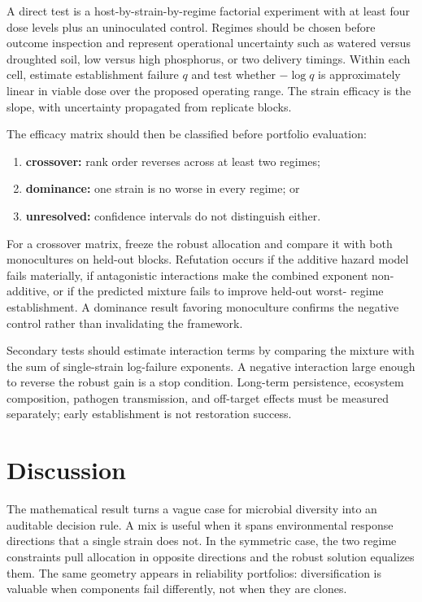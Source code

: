 \documentclass[10pt,twocolumn]{article}
\begin{document}
A direct test is a host-by-strain-by-regime factorial experiment with at least
four dose levels plus an uninoculated control. Regimes should be chosen before
outcome inspection and represent operational uncertainty such as watered versus
droughted soil, low versus high phosphorus, or two delivery timings. Within
each cell, estimate establishment failure $q$ and test whether
$-\log q$ is approximately linear in viable dose over the proposed operating
range. The strain efficacy is the slope, with uncertainty propagated from
replicate blocks.

The efficacy matrix should then be classified before portfolio evaluation:
\begin{enumerate}
\item \textbf{crossover:} rank order reverses across at least two regimes;
\item \textbf{dominance:} one strain is no worse in every regime; or
\item \textbf{unresolved:} confidence intervals do not distinguish either.
\end{enumerate}
For a crossover matrix, freeze the robust allocation and compare it with both
monocultures on held-out blocks. Refutation occurs if the additive hazard model
fails materially, if antagonistic interactions make the combined exponent
non-additive, or if the predicted mixture fails to improve held-out worst-
regime establishment. A dominance result favoring monoculture confirms the
negative control rather than invalidating the framework.

Secondary tests should estimate interaction terms by comparing the mixture
with the sum of single-strain log-failure exponents. A negative interaction
large enough to reverse the robust gain is a stop condition. Long-term
persistence, ecosystem composition, pathogen transmission, and off-target
effects must be measured separately; early establishment is not restoration
success.

\section{Discussion}

The mathematical result turns a vague case for microbial diversity into an
auditable decision rule. A mix is useful when it spans environmental response
directions that a single strain does not. In the symmetric case, the two
regime constraints pull allocation in opposite directions and the robust
solution equalizes them. The same geometry appears in reliability portfolios:
diversification is valuable when components fail differently, not when they
are clones.
\end{document}
